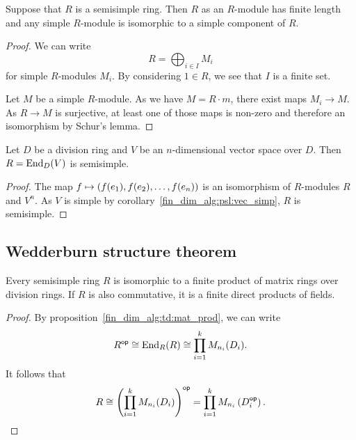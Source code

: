 \begin{posledica}
Suppose that $R$ is a semisimple ring. Then $R$ as an $R$-module
has finite length and any simple $R$-module is isomorphic to a
simple component of $R$.
\end{posledica}

\begin{proof}
We can write
\[
R = \bigoplus_{i \in I} M_i
\]
for simple $R$-modules $M_i$. By considering $1 \in R$, we see that
$I$ is a finite set.

Let $M$ be a simple $R$-module. As we have $M = R \cdot m$, there
exist maps $M_i \to M$. As $R \to M$ is surjective, at least one
of those maps is non-zero and therefore an isomorphism by Schur's
lemma.
\end{proof}

\begin{trditev}
Let $D$ be a division ring and $V$ be an $n$-dimensional vector
space over $D$. Then $R = \operatorname{End}_D(V)$ is semisimple.
\end{trditev}

\begin{proof}
The map $f \mapsto \left(f(e_1), f(e_2), \dots, f(e_n)\right)$ is an
isomorphism of $R$-modules $R$ and $V^n$. As $V$ is simple by
corollary~\ref{fin_dim_alg:psl:vec_simp}, $R$ is semisimple.
\end{proof}

\newpage

\subsection{Wedderburn structure theorem}

\begin{izrek}[Wedderburn]
Every semisimple ring $R$ is isomorphic to a finite product of
matrix rings over division rings. If $R$ is also commutative, it is
a finite direct products of fields.
\end{izrek}

\begin{proof}
By proposition~\ref{fin_dim_alg:td:mat_prod}, we can write
\[
R^{\mathsf{op}} \cong \operatorname{End}_R(R) \cong \prod_{i=1}^k M_{n_i}(D_i).
\]
It follows that
\[
R \cong
\left(\prod_{i=1}^k M_{n_i}(D_i)\right)^{\mathsf{op}} =
\prod_{i=1}^k M_{n_i} \left(D_i^{\mathsf{op}}\right). \qedhere
\]
\end{proof}

